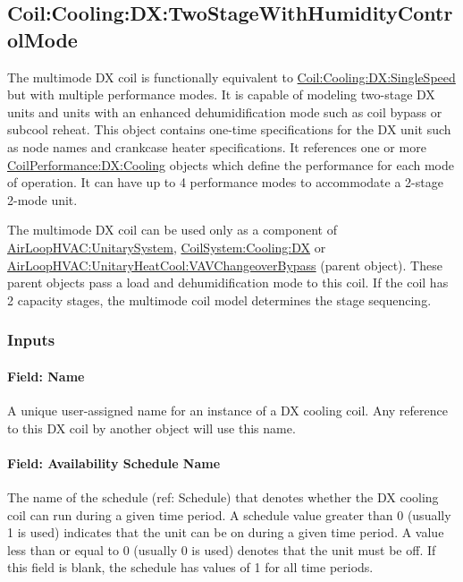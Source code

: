 \subsection{Coil:Cooling:DX:TwoStageWithHumidityControlMode}\label{coilcoolingdxtwostagewithhumiditycontrolmode}

The multimode DX coil is functionally equivalent to \hyperref[coilcoolingdxsinglespeed]{Coil:Cooling:DX:SingleSpeed} but with multiple performance modes. It is capable of modeling two-stage DX units and units with an enhanced dehumidification mode such as coil bypass or subcool reheat. This object contains one-time specifications for the DX unit such as node names and crankcase heater specifications. It references one or more \hyperref[coilperformancedxcooling]{CoilPerformance:DX:Cooling} objects which define the performance for each mode of operation. It can have up to 4 performance modes to accommodate a 2-stage 2-mode unit.

The multimode DX coil can be used only as a component of \hyperref[airloophvacunitarysystem]{AirLoopHVAC:UnitarySystem}, \hyperref[coilsystemcoolingdx]{CoilSystem:Cooling:DX} or \hyperref[airloophvacunitaryheatcoolvavchangeoverbypass]{AirLoopHVAC:UnitaryHeatCool:VAVChangeoverBypass} (parent object). These parent objects pass a load and dehumidification mode to this coil. If the coil has 2 capacity stages, the multimode coil model determines the stage sequencing.

\subsubsection{Inputs}\label{inputs-15-004}

\paragraph{Field: Name}\label{field-name-14-002}

A unique user-assigned name for an instance of a DX cooling coil. Any reference to this DX coil by another object will use this name.

\paragraph{Field: Availability Schedule Name}\label{field-availability-schedule-name-8-001}

The name of the schedule (ref: Schedule) that denotes whether the DX cooling coil can run during a given time period. A schedule value greater than 0 (usually 1 is used) indicates that the unit can be on during a given time period. A value less than or equal to 0 (usually 0 is used) denotes that the unit must be off. If this field is blank, the schedule has values of 1 for all time periods.

